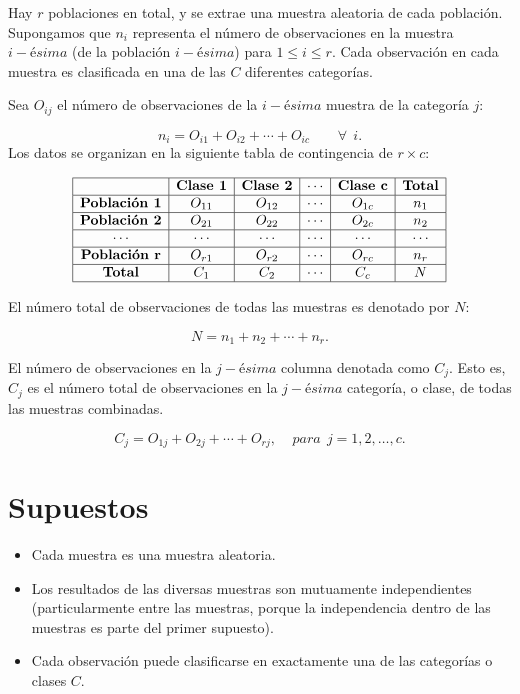 \documentclass[
  a4paper,
  oneside,
  openany]{book}
\begin{document}
Hay \(r\) poblaciones en total, y se extrae una muestra aleatoria de cada población. Supongamos que \(n_{i}\) representa el número de observaciones en la muestra \(i-ésima\) (de la población \(i-ésima\)) para \(1 \leq i \leq r\). Cada observación en cada muestra es clasificada en una de las \(C\) diferentes categorías.

Sea \(O_{ij}\) el número de observaciones de la \(i-ésima\) muestra de la categoría \(j\):

\[n_{i}= O_{i1}+O_{i2}+\cdots+O_{ic}\ \ \ \ \ \ \ \ \   \forall \ \ i.\]
Los datos se organizan en la siguiente tabla de contingencia de \(r \times c\):

\[
\begin{array}{|c|c|c|c|c|c|}
\hline
 & \textbf{Clase 1}  & \textbf{Clase 2}    & \cdots & \textbf{Clase c} &\textbf{Total}     \\
\hline
\textbf{Población 1} & O_{11} & O_{12} & \cdots & O_{1c} & n_{1}   \\
\hline
\textbf{Población 2} & O_{21} & O_{22} & \cdots & O_{2c} & n_{2}\\
\hline
\cdots    & \cdots & \cdots & \cdots & \cdots & \cdots\\
\hline
\textbf{Población r} &O_{r1} & O_{r2} & \cdots & O_{rc} & n_{r}\\
\hline
\textbf{Total}       & C_{1}  & C_{2}  & \cdots & C_{c}  & N \\
\hline
\end{array}
\]

El número total de observaciones de todas las muestras es denotado por \(N\):

\[N=n_{1}+n_{2}+\cdots+n_{r}.\]

El número de observaciones en la \(j-ésima\) columna denotada como \(C_{j}\). Esto es, \(C_{j}\) es el número total de observaciones en la \(j-ésima\) categoría, o clase, de todas las muestras combinadas.

\[C_{j}=O_{1j}+O_{2j}+\cdots+O_{rj}, \ \ \ \ \ para\ \ j= 1,2,\ldots,c. \]

\hypertarget{supuestos-11}{%
\section{Supuestos}\label{supuestos-11}}

\begin{itemize}
\item
  Cada muestra es una muestra aleatoria.
\item
  Los resultados de las diversas muestras son mutuamente independientes (particularmente entre las muestras, porque la independencia dentro de las muestras es parte del primer supuesto).
\item
  Cada observación puede clasificarse en exactamente una de las categorías o clases \(C\).
\end{itemize}
\end{document}

